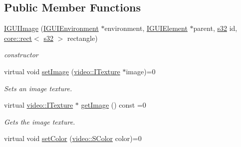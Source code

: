 \subsection*{Public Member Functions}
\begin{DoxyCompactItemize}
\item 
\mbox{\label{classirr_1_1gui_1_1IGUIImage_a079a30cd26c749a8a42b4a689678c4dc}} 
\hyperlink{classirr_1_1gui_1_1IGUIImage_a079a30cd26c749a8a42b4a689678c4dc}{I\+G\+U\+I\+Image} (\hyperlink{classirr_1_1gui_1_1IGUIEnvironment}{I\+G\+U\+I\+Environment} $\ast$environment, \hyperlink{classirr_1_1gui_1_1IGUIElement}{I\+G\+U\+I\+Element} $\ast$parent, \hyperlink{namespaceirr_ac66849b7a6ed16e30ebede579f9b47c6}{s32} id, \hyperlink{classirr_1_1core_1_1rect}{core\+::rect}$<$ \hyperlink{namespaceirr_ac66849b7a6ed16e30ebede579f9b47c6}{s32} $>$ rectangle)
\begin{DoxyCompactList}\small\item\em constructor \end{DoxyCompactList}\item 
\mbox{\label{classirr_1_1gui_1_1IGUIImage_a35a3af4957e42acb183f562d09a4ea63}} 
virtual void \hyperlink{classirr_1_1gui_1_1IGUIImage_a35a3af4957e42acb183f562d09a4ea63}{set\+Image} (\hyperlink{classirr_1_1video_1_1ITexture}{video\+::\+I\+Texture} $\ast$image)=0
\begin{DoxyCompactList}\small\item\em Sets an image texture. \end{DoxyCompactList}\item 
\mbox{\label{classirr_1_1gui_1_1IGUIImage_a5ed7402ca9d9810d320ff11f1251e8c0}} 
virtual \hyperlink{classirr_1_1video_1_1ITexture}{video\+::\+I\+Texture} $\ast$ \hyperlink{classirr_1_1gui_1_1IGUIImage_a5ed7402ca9d9810d320ff11f1251e8c0}{get\+Image} () const =0
\begin{DoxyCompactList}\small\item\em Gets the image texture. \end{DoxyCompactList}\item 
\mbox{\label{classirr_1_1gui_1_1IGUIImage_ac836018aafc61f6b9fe88acfa2267d8e}} 
virtual void \hyperlink{classirr_1_1gui_1_1IGUIImage_ac836018aafc61f6b9fe88acfa2267d8e}{set\+Color} (\hyperlink{classirr_1_1video_1_1SColor}{video\+::\+S\+Color} color)=0

\end{DoxyCompactItemize}
